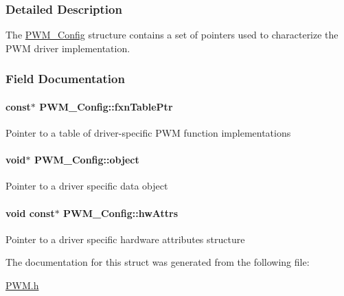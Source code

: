\subsubsection{Detailed Description}
The \hyperlink{struct_p_w_m___config}{P\-W\-M\-\_\-\-Config} structure contains a set of pointers used to characterize the P\-W\-M driver implementation. 

\subsubsection{Field Documentation}
\paragraph[{fxn\-Table\-Ptr}]{ const$\ast$ P\-W\-M\-\_\-\-Config\-::fxn\-Table\-Ptr}\label{struct_p_w_m___config_ac02604d8e0fafc8b5ff71171a4bf3461}
Pointer to a table of driver-\/specific P\-W\-M function implementations 
\paragraph[{object}]{\setlength{\rightskip}{0pt plus 5cm}void$\ast$ P\-W\-M\-\_\-\-Config\-::object}\label{struct_p_w_m___config_a33c57f0fe6b8af13f7a9c8ec392019a6}
Pointer to a driver specific data object 
\paragraph[{hw\-Attrs}]{\setlength{\rightskip}{0pt plus 5cm}void const$\ast$ P\-W\-M\-\_\-\-Config\-::hw\-Attrs}\label{struct_p_w_m___config_a2299aba19683340f917ca962a9536148}
Pointer to a driver specific hardware attributes structure 

The documentation for this struct was generated from the following file\-:\begin{DoxyCompactItemize}
\item 
\hyperlink{_p_w_m_8h}{P\-W\-M.\-h}\end{DoxyCompactItemize}
